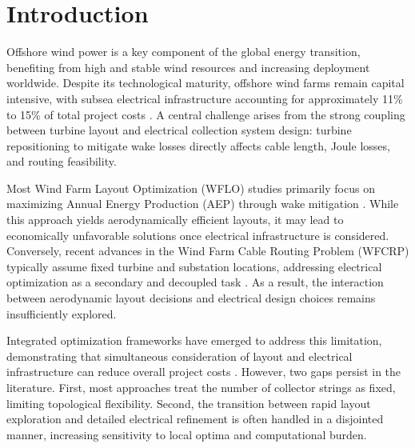 \documentclass[format=sigconf,anonymous=true,review=true]{acmart}
\begin{document}

\maketitle

\section{Introduction}

Offshore wind power is a key component of the global energy transition, benefiting from high and stable wind resources and increasing deployment worldwide. Despite its technological maturity, offshore wind farms remain capital intensive, with subsea electrical infrastructure accounting for approximately 11\% to 15\% of total project costs \cite{Alencar2026Flexible, IRENA2024Costs}. A central challenge arises from the strong coupling between turbine layout and electrical collection system design: turbine repositioning to mitigate wake losses directly affects cable length, Joule losses, and routing feasibility.

Most Wind Farm Layout Optimization (WFLO) studies primarily focus on maximizing Annual Energy Production (AEP) through wake mitigation \cite{Silva2025Layout, Baker2019Best}. While this approach yields aerodynamically efficient layouts, it may lead to economically unfavorable solutions once electrical infrastructure is considered. Conversely, recent advances in the Wind Farm Cable Routing Problem (WFCRP) typically assume fixed turbine and substation locations, addressing electrical optimization as a secondary and decoupled task \cite{Alencar2026Flexible, Machado2024Hybrid}. As a result, the interaction between aerodynamic layout decisions and electrical design choices remains insufficiently explored.

Integrated optimization frameworks have emerged to address this limitation, demonstrating that simultaneous consideration of layout and electrical infrastructure can reduce overall project costs \cite{Wang2019Integrated, Jin2025Integrated}. However, two gaps persist in the literature. First, most approaches treat the number of collector strings as fixed, limiting topological flexibility. Second, the transition between rapid layout exploration and detailed electrical refinement is often handled in a disjointed manner, increasing sensitivity to local optima and computational burden.
\end{document}
